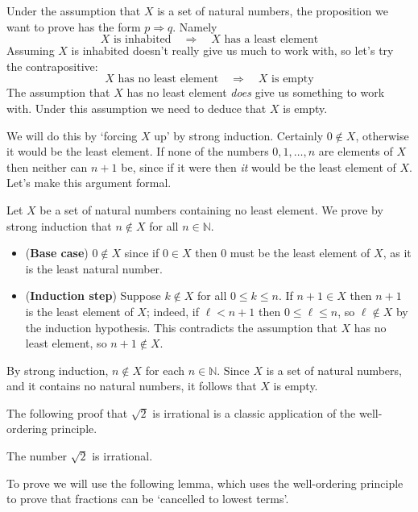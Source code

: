 \begin{cidea}
Under the assumption that $X$ is a set of natural numbers, the proposition we want to prove has the form $p \Rightarrow q$. Namely
\[ X \text{ is inhabited} \quad \Rightarrow \quad X \text{ has a least element} \]
Assuming $X$ is inhabited doesn't really give us much to work with, so let's try the contrapositive:
\[ X \text{ has no least element} \quad \Rightarrow \quad X \text{ is empty} \]
The assumption that $X$ has no least element \textit{does} give us something to work with. Under this assumption we need to deduce that $X$ is empty.

We will do this by `forcing $X$ up' by strong induction. Certainly $0 \not \in X$, otherwise it would be the least element. If none of the numbers $0, 1, \dots, n$ are elements of $X$ then neither can $n+1$ be, since if it were then \textit{it} would be the least element of $X$. Let's make this argument formal.
\end{cidea}

\begin{cproof}
Let $X$ be a set of natural numbers containing no least element. We prove by strong induction that $n \not \in X$ for all $n \in \mathbb{N}$.

\begin{itemize}
\item (\textbf{Base case}) $0 \not \in X$ since if $0 \in X$ then $0$ must be the least element of $X$, as it is the least natural number.
\item (\textbf{Induction step}) Suppose $k \not \in X$ for all $0 \le k \le n$. If $n+1 \in X$ then $n+1$ is the least element of $X$; indeed, if $\ell < n+1$ then $0 \le \ell \le n$, so $\ell \not \in X$ by the induction hypothesis. This contradicts the assumption that $X$ has no least element, so $n+1 \not \in X$.
\end{itemize}
By strong induction, $n \not \in X$ for each $n \in \mathbb{N}$. Since $X$ is a set of natural numbers, and it contains no natural numbers, it follows that $X$ is empty.
\end{cproof}

The following proof that $\sqrt{2}$ is irrational is a classic application of the well-ordering principle.

\begin{proposition}
\label{propSqrt2Irrational}
The number $\sqrt{2}$ is irrational.
\end{proposition}

To prove  we will use the following lemma, which uses the well-ordering principle to prove that fractions can be `cancelled to lowest terms'.

